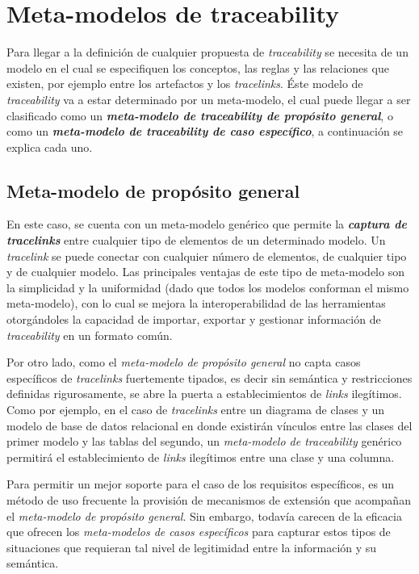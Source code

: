 \documentclass[a4paper,12pt,twoside,spanish,openright]{book}
\begin{document}
\section{Meta-modelos de traceability}

Para llegar a la definición de cualquier propuesta de \textit{traceability} se necesita de un modelo en el cual se especifiquen los conceptos, las reglas y las relaciones que existen, por ejemplo entre los artefactos y los \textit{tracelinks}. Éste modelo de \textit{traceability} va a estar determinado por un meta-modelo, el cual puede llegar a ser clasificado como un \textit{\textbf{meta-modelo de traceability de propósito general}}, o como un \textit{\textbf{meta-modelo de traceability de caso específico}}, a continuación se explica cada uno.

\subsection{Meta-modelo de propósito general}
\label{subsec:MetaModeloPropositoGeneral}

En este caso, se cuenta con un meta-modelo genérico que permite la \textit{\textbf{captura de tracelinks}} entre cualquier tipo de elementos de un determinado modelo. Un \textit{tracelink} se puede conectar con cualquier número de elementos, de cualquier tipo y de cualquier modelo. Las principales ventajas de este tipo de meta-modelo son la simplicidad y la uniformidad (dado que todos los modelos conforman el mismo meta-modelo), con lo cual se mejora la interoperabilidad de las herramientas otorgándoles la capacidad de importar, exportar y gestionar información de \textit{traceability} en un formato común.

Por otro lado, como el \textit{meta-modelo de propósito general} no capta casos específicos de \textit{tracelinks} fuertemente tipados, es decir sin semántica y restricciones definidas rigurosamente, se abre la puerta a establecimientos de \textit{links} ilegítimos. Como por ejemplo, en el caso de \textit{tracelinks} entre un diagrama de clases y un modelo de base de datos relacional en donde existirán vínculos entre las clases del primer modelo y las tablas del segundo, un \textit{meta-modelo de traceability} genérico permitirá el establecimiento de \textit{links} ilegítimos entre una clase y una columna.

Para permitir un mejor soporte para el caso de los requisitos específicos, es un método de uso frecuente la provisión de mecanismos de extensión que acompañan el \textit{meta-modelo de propósito general}. Sin embargo, todavía carecen de la eficacia que ofrecen los \textit{meta-modelos de casos específicos} para capturar estos tipos de situaciones que requieran tal nivel de legitimidad entre la información y su semántica.
\end{document}
